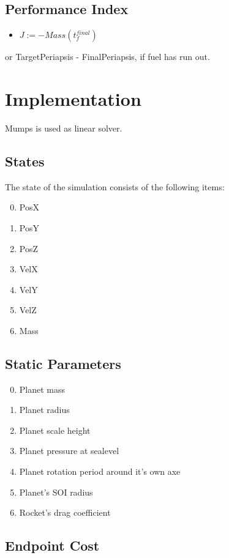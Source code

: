 \documentclass[11pt]{report}
\begin{document}
\section{Performance Index}

\begin{itemize}
\item $J := - Mass(t_f^{final})$
\end{itemize}
or TargetPeriapsis - FinalPeriapsis, if fuel has run out.

\chapter{Implementation}

Mumps is used as linear solver.

\section{States}

The state of the simulation consists of the following items:

\begin{enumerate}
\setcounter{enumi}{-1}
\item PosX
\item PosY
\item PosZ
\item VelX
\item VelY
\item VelZ
\item Mass
\end{enumerate}

\section{Static Parameters}

\begin{enumerate}
\setcounter{enumi}{-1}
\item Planet mass
\item Planet radius
\item Planet scale height
\item Planet pressure at sealevel
\item Planet rotation period around it's own axe
\item Planet's SOI radius
\item Rocket's drag coefficient
\end{enumerate}

\section{Endpoint Cost}
\end{document}
